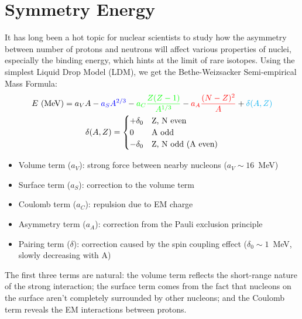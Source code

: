 \section{Symmetry Energy} 
It has long been a hot topic for nuclear scientists to study how the asymmetry 
between number of protons and neutrons will affect various properties of nuclei, 
especially the binding energy, which hints at the limit of rare isotopes. Using the simplest 
Liquid Drop Model (LDM), we get the Bethe-Weizsacker Semi-empirical Mass Formula:
\begin{equation}
    \begin{gathered}
	E\ (\mathrm{MeV}) = \textcolor{black}{a_V A} 
	    - \textcolor{blue}{a_S A^{2/3}} 
	    - \textcolor{green}{a_C\frac{Z(Z-1)}{A^{1/3}}} 
	    - \textcolor{red}{a_A\frac{(N-Z)^2}{A}} 
	    + \textcolor{cyan}{\delta(A, Z)} \\
	\delta(A, Z) = 
	    \begin{cases}
		+\delta_0	& \text{Z, N even} \\
		0		& \text{A odd}	\\
		-\delta_0	& \text{Z, N odd (A even)} \\
	    \end{cases}
    \end{gathered}
    \label{eq:mass-formula}
\end{equation}

\begin{itemize}
    \color{black} \item Volume term ($a_V$): strong force between nearby nucleons ($a_V \sim 16$~MeV)
    \color{blue}  \item Surface term ($a_S$): correction to the volume term 
    \color{green} \item Coulomb term ($a_C$): repulsion due to EM charge
    \color{red}   \item Asymmetry term ($a_A$): correction from the Pauli exclusion principle
    \color{cyan}  \item Pairing term ($\delta$): correction caused by the spin coupling effect 
	($\delta_0 \sim 1$~MeV, slowly decreasing with A)
\end{itemize}

The first three terms are natural:
the volume term reflects the short-range nature of the strong interaction; the
surface term comes from the fact that nucleons on the surface aren't completely 
surrounded by other nucleons; and the Coulomb term reveals the EM interactions between
protons. 

